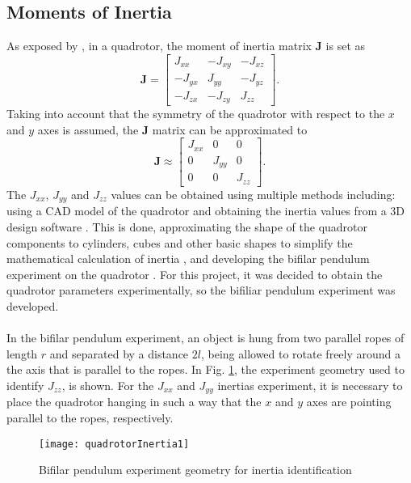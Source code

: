 \subsection{Moments of Inertia}
As exposed by \cite{Lee2011}, in a quadrotor, the moment of inertia matrix $\mathbf{J}$ is set as
\begin{equation}
\mathbf{J} = \begin{bmatrix}
J_{xx} & -J_{xy} & -J_{xz} \\
-J_{yx} & J_{yy} & -J_{yz} \\
-J_{zx} & -J_{zy} & J_{zz}
\end{bmatrix}.
\end{equation}
Taking into account that the symmetry of the quadrotor with respect to the $x$ and $y$ axes is assumed, the $\mathbf{J}$ matrix can be approximated to
\begin{equation}
\mathbf{J}  	\approx  \begin{bmatrix}
J_{xx} & 0 & 0 \\
0 & J_{yy} & 0 \\
0 & 0 & J_{zz}
\end{bmatrix}.
\end{equation}
The $J_{xx}$, $J_{yy}$ and $J_{zz}$ values can be obtained using multiple methods including: using a CAD model of the quadrotor and obtaining the inertia values from a 3D design software \cite{Khodja2017}. This is done, approximating the shape of the quadrotor components to cylinders, cubes and other basic shapes to simplify the mathematical calculation of inertia \cite{Tomas2011}, and developing the bifilar pendulum experiment on the quadrotor \cite{Garcia2017}. For this project, it was decided to obtain the quadrotor parameters experimentally, so the bifiliar pendulum experiment was developed.
\\\\
In the bifilar pendulum experiment, an object is hung from two parallel ropes of length $r$ and separated by a distance $2l$, being allowed to rotate freely around a the axis that is parallel to the ropes. In Fig. \ref{fig:bifilar}, the experiment geometry used to identify $J_{zz}$, is shown. For the $J_{xx}$ and $J_{yy}$ inertias experiment, it is necessary to place the quadrotor hanging in such a way that the $x$ and $y$ axes are pointing parallel to the ropes, respectively.
\begin{figure}[h]
	\begin{center}
		\texttt{[image: quadrotorInertia1]}    
		\caption{Bifilar pendulum experiment geometry for inertia identification} 
		\label{fig:bifilar}
	\end{center}
\end{figure}
